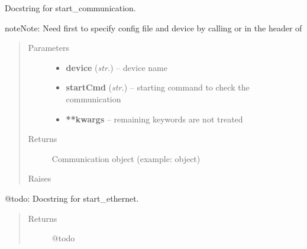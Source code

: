 \documentclass[letterpaper,10pt,english]{sphinxmanual}
\begin{document}
\begin{fulllineitems}
\begin{fulllineitems}
\end{fulllineitems}


\begin{fulllineitems}
\label{enuActor.Devices:enuActor.Devices.Device.Device.start_communication}
Docstring for start\_communication.

\begin{notice}{note}{Note:}
Need first to specify config file and device by calling {\hyperref[enuActor.Devices:enuActor.Devices.Device.Device.load_cfg]{}}
or in the header of {\hyperref[enuActor.Devices:enuActor.Devices.Device.Device.start_communication]{}}
\end{notice}
\begin{quote}\begin{description}
\item[{Parameters}] \leavevmode\begin{itemize}
\item {} 
\textbf{device} (\emph{str.}) -- device name

\item {} 
\textbf{startCmd} (\emph{str.}) -- starting command to check the communication

\item {} 
\textbf{**kwargs} -- remaining keywords are not treated

\end{itemize}

\item[{Returns}] \leavevmode
Communication object (example:  object)

\item[{Raises}] \leavevmode
{\hyperref[enuActor.Devices:enuActor.Devices.Error.CfgFileErr]{}}

\end{description}\end{quote}

\end{fulllineitems}


\begin{fulllineitems}
\label{enuActor.Devices:enuActor.Devices.Device.Device.start_ethernet}
@todo: Docstring for start\_ethernet.
\begin{quote}\begin{description}
\item[{Returns}] \leavevmode
@todo


\end{description}
\end{quote}
\end{fulllineitems}
\end{fulllineitems}
\end{document}
